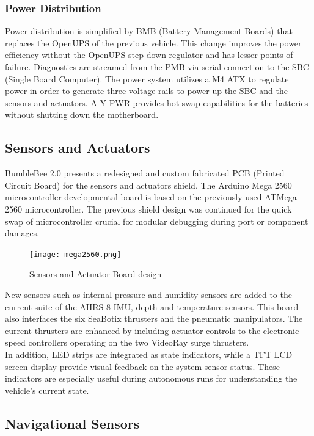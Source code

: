 \documentclass[journal,12pt]{IEEEtran}
\begin{document}
\subsubsection{Power Distribution}
Power distribution is simplified by BMB (Battery Management Boards) that replaces the OpenUPS of the previous vehicle. This change improves the power efficiency without the OpenUPS step down regulator and has lesser points of failure. Diagnostics are streamed from the PMB via serial connection to the SBC  (Single Board Computer). The power system utilizes a M4 ATX to regulate power in order to generate three voltage rails to power up the SBC and the sensors and actuators. A Y-PWR provides hot-swap capabilities for the batteries without shutting down the motherboard. 

\subsection{Sensors and Actuators}
BumbleBee 2.0 presents a redesigned and custom fabricated PCB (Printed Circuit Board) for the sensors and actuators shield. The Arduino Mega 2560 microcontroller developmental board is based on the previously used ATMega 2560 microcontroller. The previous shield design was continued for the quick swap of microcontroller crucial for modular debugging during port or component damages. \\

\begin{figure}[h]
\centering
\texttt{[image: mega2560.png]}
\caption{Sensors and Actuator Board design}
\captionsetup{justification=centering}
\end{figure}

New sensors such as internal pressure and humidity sensors are added to the current suite of the AHRS-8 IMU, depth and temperature sensors. This board also interfaces the six SeaBotix thrusters and the pneumatic manipulators. The current thrusters are enhanced by including actuator controls to the electronic speed controllers operating on the two VideoRay surge thrusters. \\

In addition, LED strips are integrated as state indicators, while a TFT LCD screen display provide visual feedback on the system sensor status. These indicators are especially useful during autonomous runs for understanding the vehicle's current state.

\subsection{Navigational Sensors}
\end{document}

